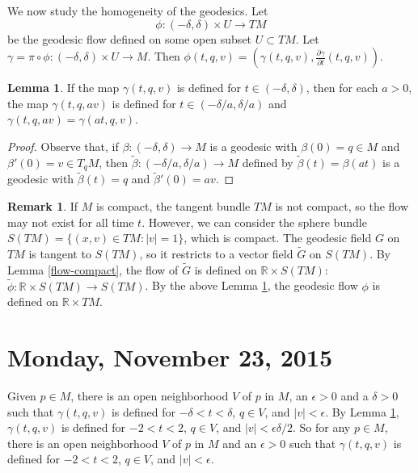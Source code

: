 \documentclass{amsart}
\numberwithin{equation}{section}
\newcommand{\bR}{\mathbb{R}}
\theoremstyle{definition}
\newtheorem{remark}[definition]{Remark}
\theoremstyle{theorem}
\newtheorem{lemma}[definition]{Lemma}
\begin{document}
We now study the homogeneity of the geodesics. Let 
\[
\phi : (-\delta, \delta) \times U \to TM
\]
be the geodesic flow defined on some open subset $U \subset TM$. Let $\gamma=\pi\circ \phi: (-\delta, \delta) \times U \to M$.
Then $\phi(t,q,v)=(\gamma(t,q,v),\frac{\partial \gamma}{\partial t}(t,q,v))$. 

\begin{lemma}\label{geodesic-homo}
If the map $\gamma(t,q,v)$ is defined for $t \in (-\delta, \delta)$, then for each $a > 0$, the map $\gamma(t,q,av)$ 
is defined for $t \in (-\delta/a, \delta/a)$ and $\gamma(t,q,av) = \gamma(at, q,v)$. 
\end{lemma}
\begin{proof} Observe that, if $\beta:(-\delta,\delta)\to M$ is a geodesic 
with $\beta(0)=q\in M$ and $\beta'(0)= v\in T_qM$, then
$\tilde{\beta}:(-\delta/a,\delta/a)\to M$ defined by $\tilde{\beta}(t)=\beta(at)$ is 
a geodesic with $\tilde{\beta}(t)=q$ and $\tilde{\beta}'(0)=av$. 
\end{proof}

\begin{remark}
If $M$ is compact, the tangent bundle $TM$ is not compact, so the flow may not exist for all time $t$. However, we can consider the sphere bundle $S(TM)=\{(x,v)\in TM: |v|=1\}$, which is compact. The geodesic field $G$ on $TM$ is tangent to 
$S(TM)$, so it restricts to a vector field $\tilde{G}$ on $S(TM)$. By Lemma \ref{flow-compact}, the flow
of $\tilde{G}$ is defined on $\bR\times S(TM)$: $\tilde{\phi}: \bR\times S(TM)\to S(TM)$. 
By the above Lemma \ref{geodesic-homo}, the geodesic flow $\phi$ is defined on $\bR\times TM$. 
\end{remark}







\section{Monday, November 23, 2015}
Given $p \in M$, there is an open neighborhood $V$ of $p$ in $M$, an $\epsilon > 0$ and a $\delta > 0$ such that 
$\gamma(t,q,v)$ is defined for $- \delta < t < \delta$, $q\in V$, and $|v| < \epsilon$. By Lemma \ref{geodesic-homo}, 
$\gamma(t,q,v)$ is defined for $-2 < t < 2$, $q \in V$, and $|v| < \epsilon \delta/2$. So for any $p \in M$, 
there is an open neighborhood $V$ of $p$ in $M$ and an $\epsilon > 0$ such that $\gamma(t,q,v)$ is defined for $-2 < t < 2$, $q \in V$, and $|v| < \epsilon$. 
\end{document}
